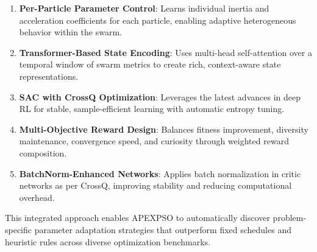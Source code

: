 \begin{enumerate}
\item \textbf{Per-Particle Parameter Control}: Learns individual inertia and acceleration coefficients for each particle, enabling adaptive heterogeneous behavior within the swarm.
\item \textbf{Transformer-Based State Encoding}: Uses multi-head self-attention over a temporal window of swarm metrics to create rich, context-aware state representations.
\item \textbf{SAC with CrossQ Optimization}: Leverages the latest advances in deep RL for stable, sample-efficient learning with automatic entropy tuning.
\item \textbf{Multi-Objective Reward Design}: Balances fitness improvement, diversity maintenance, convergence speed, and curiosity through weighted reward composition.
\item \textbf{BatchNorm-Enhanced Networks}: Applies batch normalization in critic networks as per CrossQ, improving stability and reducing computational overhead.
\end{enumerate}

This integrated approach enables APEXPSO to automatically discover problem-specific parameter adaptation strategies that outperform fixed schedules and heuristic rules across diverse optimization benchmarks.

